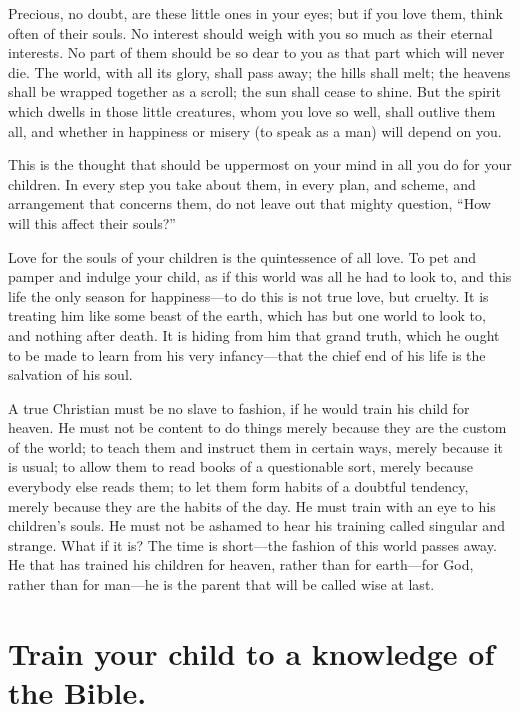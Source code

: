 \documentclass[
]{book}
\begin{document}
Precious, no doubt, are these little ones in your eyes; but if you love them, think often of their souls. No interest should weigh with you so much as their eternal interests. No part of them should be so dear to you as that part which will never die. The world, with all its glory, shall pass away; the hills shall melt; the heavens shall be wrapped together as a scroll; the sun shall cease to shine. But the spirit which dwells in those little creatures, whom you love so well, shall outlive them all, and whether in happiness or misery (to speak as a man) will depend on you.

This is the thought that should be uppermost on your mind in all you do for your children. In every step you take about them, in every plan, and scheme, and arrangement that concerns them, do not leave out that mighty question, ``How will this affect their souls?''

Love for the souls of your children is the quintessence of all love. To pet and pamper and indulge your child, as if this world was all he had to look to, and this life the only season for happiness---to do this is not true love, but cruelty. It is treating him like some beast of the earth, which has but one world to look to, and nothing after death. It is hiding from him that grand truth, which he ought to be made to learn from his very infancy---that the chief end of his life is the salvation of his soul.

A true Christian must be no slave to fashion, if he would train his child for heaven. He must not be content to do things merely because they are the custom of the world; to teach them and instruct them in certain ways, merely because it is usual; to allow them to read books of a questionable sort, merely because everybody else reads them; to let them form habits of a doubtful tendency, merely because they are the habits of the day. He must train with an eye to his children's souls. He must not be ashamed to hear his training called singular and strange. What if it is? The time is short---the fashion of this world passes away. He that has trained his children for heaven, rather than for earth---for God, rather than for man---he is the parent that will be called wise at last.

\hypertarget{train-your-child-to-a-knowledge-of-the-bible.}{%
\chapter{Train your child to a knowledge of the Bible.}\label{train-your-child-to-a-knowledge-of-the-bible.}}
\end{document}
